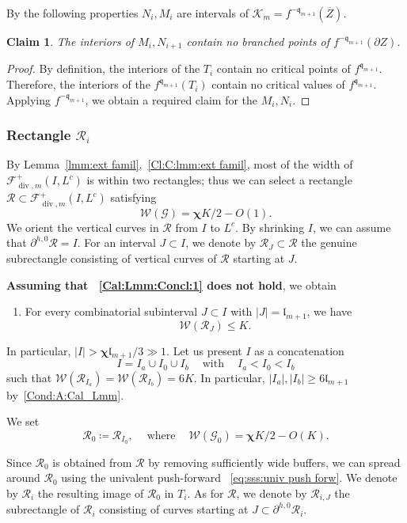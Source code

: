 \documentclass{amsart}
\renewcommand{\sp}{{\ \ }}
\newcommand{\1}{{\mathbb 1 }}
\newcommand{\FamG}{{\mathcal G}}
\renewcommand{\div}{{\operatorname{div}}}
\newcommand{\Fam}{{\mathcal F}}
\newcommand{\Width}{{\mathcal W}}
\newcommand\RR{\mathcal{R}}
\newcommand{\qq}{\mathfrak{q}}
\newcommand{\length}{{\mathfrak l}}
\newtheorem{claim4}{Claim}
\theoremstyle{remark}
\numberwithin{equation}{section}
\theoremstyle{definition}
\newcommand{\filled}{{\mathcal {K} }}
\newcommand{\bchi}{{\boldsymbol{ \chi}}}
\begin{document}
By the following properties $N_i,M_i$ are intervals of $\filled_m=f^{-\qq_{m+1}}(\overline Z).$



\begin{claim4}
The interiors of $M_i,N_{i+1}$ contain no branched points of $f^{-\qq_{m+1}}(\partial Z)$. 
\end{claim4}
\begin{proof}
By definition, the interiors of the $T_i$ contain no critical points of $f^{\qq_{m+1}}$. Therefore, 
the interiors of the $f^{\qq_{m+1}}(T_i)$ contain no critical values of $f^{\qq_{m+1}}$.  Applying $f^{-\qq_{m+1}}$, we obtain a required claim for the $M_i, N_i$.
\end{proof} 






\subsubsection{Rectangle $\RR_i$} \label{sss:RR_i}By Lemma~\ref{lmm:ext famil},~\ref{Cl:C:lmm:ext famil}, most of the width of $\Fam^+_{\div, m}(I, L^c)$  is within two rectangles; thus we can select a rectangle $\RR\subset \Fam^+_{\div, m}(I, L^c)$ satisfying 
\[\Width(\FamG) =\bchi K/2 -O(1) .\]
We orient the vertical curves in $\RR$ from $I$ to $L^c$. By shrinking $I$, we can assume that $\partial ^{h,0} \RR =I$. For an interval $J\subset I$, we denote by $\RR_J\subset \RR$ the genuine subrectangle  consisting of vertical curves of $\RR$ starting at $J$.

 {\bf Assuming that ~\ref{Cal:Lmm:Concl:1} does not hold}, we obtain 
\begin{enumerate}[label=\text{(\Alph*)},font=\normalfont,leftmargin=*]
\item\label{Cond:A:Cal_Lmm} For every combinatorial subinterval $J\subset I$ with $|J|=\length_{m+1}$, we have 
\[\Width(\RR_J) \le K.\]
\end{enumerate}
In particular, $|I|> \bchi \length_{m+1}/3\gg 1$. Let us present $I$ as a concatenation \[I=I_a\cup I_0\cup I_b  \sp\sp\text{ with } \sp\sp I_a<I_0 <I_b \] such that $\Width(\RR_{I_a})=\Width(\RR_{I_b})=6K$. In particular, $|I_a|,|I_b|\ge 6\length_{m+1}$ by~\ref{Cond:A:Cal_Lmm}.

We set
\[ \RR_0\coloneqq \RR_{I_0}, \sp\sp\text{ where }\sp\sp \Width(\FamG_0) =\bchi K/2-O(K).\]

Since $\RR_0$ is obtained from $\RR$ by removing sufficiently wide buffers, we can spread around $\RR_0$ using the univalent push-forward ~\eqref{eq:sss:univ push forw}. We denote by $\RR_i$ the resulting image of $\RR_0$ in $T_i$. As for $\RR$, we denote by $\RR_{i, J}$ the subrectangle of $\RR_i$ consisting of curves starting at $J\subset \partial ^{h,0} \RR_i$.
\end{document}
